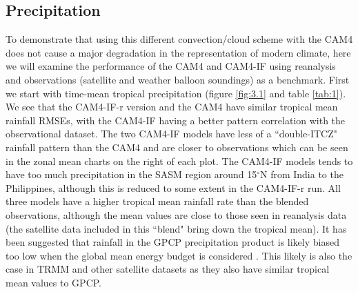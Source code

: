 \documentclass[letterpaper,12pt,titlepage,oneside,final]{book}
\begin{document}
\subsection{Precipitation}
To demonstrate that using this different convection/cloud scheme with the CAM4 does not cause a major degradation in the representation of modern climate, here we will examine the performance of the CAM4 and CAM4-IF using reanalysis and observations (satellite and weather balloon soundings) as a benchmark. First we start with time-mean tropical precipitation (figure \ref{fig:3.1} and table \ref{tab:1}). We see that the CAM4-IF-r version and the CAM4 have similar tropical mean rainfall RMSEs, with the CAM4-IF having a better pattern correlation with the observational dataset. The two CAM4-IF models  have less of a ``double-ITCZ" rainfall pattern \citep{mechoso_seasonal_1995} than the CAM4 and are closer to observations which can be seen in the zonal mean charts on the right of each plot. The CAM4-IF models tends to have too much precipitation in the SASM region around 15$^\circ$N from India to the Philippines, although this is reduced to some extent in the CAM4-IF-r run. All three models have a higher tropical mean rainfall rate than the blended observations, although the mean values are close to those seen in reanalysis data (the satellite data included in this ``blend" bring down the tropical mean). It has been suggested that rainfall in the GPCP precipitation product is likely biased too low when the global mean energy budget is considered \citep{trenberth_earths_2009,trenberth_regional_2013}. This likely is also the case in TRMM and other satellite datasets as they also have similar tropical mean values to GPCP.
\end{document}
